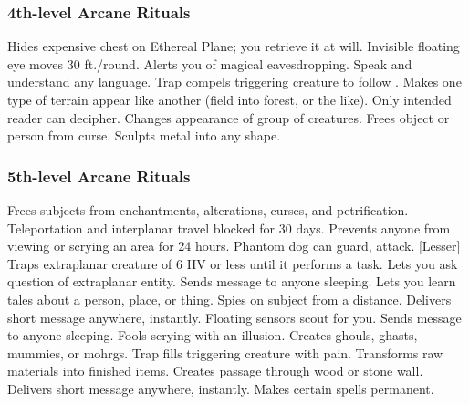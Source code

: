 \subsubsection{4th-level Arcane Rituals}
\begin{rituallist}
    \F Hides expensive chest on Ethereal Plane; you retrieve it at will.
     Invisible floating eye moves 30 ft./round.
     Alerts you of magical eavesdropping.
     Speak and understand any language.
     Trap compels triggering creature to follow .
     Makes one type of terrain appear like another (field into forest, or the like).
     Only intended reader can decipher.
     Changes appearance of group of creatures.
     Frees object or person from curse.
     Sculpts metal into any shape.
\end{rituallist}

\subsubsection{5th-level Arcane Rituals}
\begin{rituallist}
     Frees subjects from enchantments, alterations, curses, and petrification.
     Teleportation and interplanar travel blocked for 30 days.
     Prevents anyone from viewing or scrying an area for 24 hours.
     Phantom dog can guard, attack.
    [Lesser] Traps extraplanar creature of 6 HV or less until it performs a task.
     Lets you ask question of extraplanar entity.
     Sends message to anyone sleeping.
    \F Lets you learn tales about a person, place, or thing.
    \F Spies on subject from a distance.
     Delivers short message anywhere, instantly.
     Floating sensors scout for you.
     Sends message to anyone sleeping.
     Fools scrying with an illusion.
     Creates ghouls, ghasts, mummies, or mohrgs.
     Trap fills triggering creature with pain.
     Transforms raw materials into finished items.
     Creates passage through wood or stone wall.
     Delivers short message anywhere, instantly.
     Makes certain spells permanent.
\end{rituallist}

